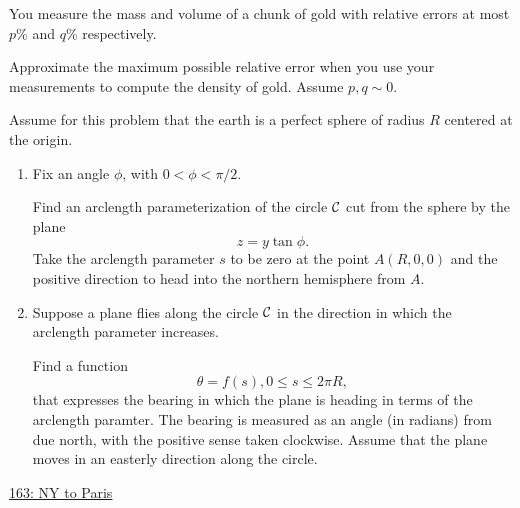 \documentclass{ximera}
\begin{document}
\begin{question}  \label{Qctr43trtg44}
You measure the mass and volume of a chunk of gold with relative errors at most $p\%$ and $q\%$ respectively.

Approximate the maximum possible relative error when you use your measurements to compute the density of gold. Assume $p,q\sim 0$.
\end{question}

\begin{question}  \label{Q434trgfgfg}
Assume for this problem that the earth is a perfect sphere of radius $R$ centered at the origin.

\begin{enumerate}
\item Fix an angle $\phi$, with $0< \phi < \pi/2$. 

Find an arclength parameterization of the circle ${\cal C}$ cut from the sphere by the plane 
\[
      z = y \tan \phi .
\]
Take the arclength parameter $s$ to be zero at the point $A(R,0,0)$ and the positive direction to head into the northern hemisphere from $A$.

\item Suppose a plane flies along the circle ${\cal C}$ in the direction in which the arclength parameter increases.

Find a function
\[
 \theta = f(s) , 0\leq s \leq 2\pi R,
\]
that expresses the bearing in which the plane is heading in terms of the arclength paramter. The bearing is measured as an angle (in radians) from due north, with the positive sense taken clockwise. Assume that the plane moves in an easterly direction along the circle. 
\end{enumerate}

\begin{onlineOnly}
    \begin{center}
\end{center}
\end{onlineOnly}


\href{https://www.desmos.com/3d/umtip2fclm}{163: NY to Paris}


\end{question}
\end{document}
